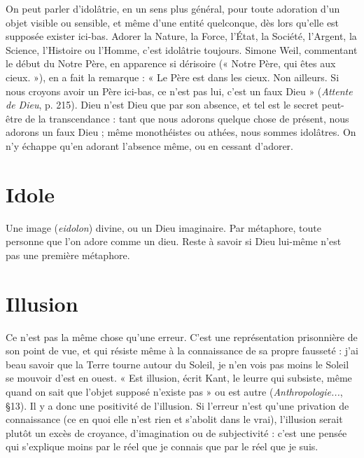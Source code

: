 On peut parler d’idolâtrie, en un sens plus général, pour toute adoration
d’un objet visible ou sensible, et même d’une entité quelconque, dès lors qu’elle
est supposée exister ici-bas. Adorer la Nature, la Force, l’État, la Société,
l’Argent, la Science, l'Histoire ou l'Homme, c’est idolâtrie toujours. Simone
Weil, commentant le début du Notre Père, en apparence si dérisoire (« Notre
Père, qui êtes aux cieux. »), en a fait la remarque : « Le Père est dans les cieux.
Non ailleurs. Si nous croyons avoir un Père ici-bas, ce n’est pas lui, c’est un
faux Dieu » ({\it Attente de Dieu}, p. 215). Dieu n’est Dieu que par son absence, et
tel est le secret peut-être de la transcendance : tant que nous adorons quelque
chose de présent, nous adorons un faux Dieu ; même monothéistes ou athées,
nous sommes idolâtres. On n’y échappe qu’en adorant l'absence même, ou en
cessant d’adorer.

\section{Idole}
Une image ({\it eidolon}) divine, ou un Dieu imaginaire. Par métaphore,
toute personne que l’on adore comme un dieu. Reste à
savoir si Dieu lui-même n’est pas une première métaphore.

\section{Illusion}
Ce n’est pas la même chose qu’une erreur. C’est une représentation
prisonnière de son point de vue, et qui résiste même à la
connaissance de sa propre fausseté : j’ai beau savoir que la Terre tourne autour
du Soleil, je n’en vois pas moins le Soleil se mouvoir d’est en ouest. « Est illusion,
écrit Kant, le leurre qui subsiste, même quand on sait que l’objet supposé
n'existe pas » ou est autre ({\it Anthropologie...}, \S 13). Il y a donc une positivité de
l'illusion. Si l'erreur n’est qu’une privation de connaissance (ce en quoi elle
n'est rien et s’abolit dans le vrai), l'illusion serait plutôt un excès de croyance,
d'imagination ou de subjectivité : c’est une pensée qui s'explique moins par le
réel que je connais que par le réel que je suis.


